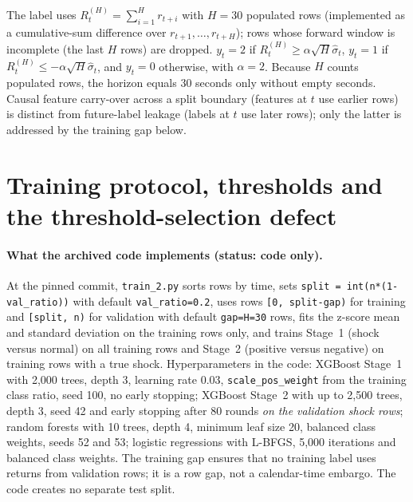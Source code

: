 \documentclass[10pt,a4paper]{article}
\begin{document}
The label uses $R^{(H)}_t=\sum_{i=1}^{H}r_{t+i}$ with $H=30$ populated rows (implemented as a cumulative-sum difference over $r_{t+1},\dots,r_{t+H}$); rows whose forward window is incomplete (the last $H$ rows) are dropped. $y_t=2$ if $R^{(H)}_t\ge\alpha\sqrt{H}\hat\sigma_t$, $y_t=1$ if $R^{(H)}_t\le-\alpha\sqrt{H}\hat\sigma_t$, and $y_t=0$ otherwise, with $\alpha=2$. Because $H$ counts populated rows, the horizon equals 30 seconds only without empty seconds. Causal feature carry-over across a split boundary (features at $t$ use earlier rows) is distinct from future-label leakage (labels at $t$ use later rows); only the latter is addressed by the training gap below.

\section{Training protocol, thresholds and the threshold-selection defect}
\label{sec:training}
\paragraph{What the archived code implements (status: code only).} At the pinned commit, \texttt{train\_2.py} sorts rows by time, sets \texttt{split = int(n*(1-val\_ratio))} with default \texttt{val\_ratio=0.2}, uses rows \texttt{[0, split-gap)} for training and \texttt{[split, n)} for validation with default \texttt{gap=H=30} rows, fits the z-score mean and standard deviation on the training rows only, and trains Stage~1 (shock versus normal) on all training rows and Stage~2 (positive versus negative) on training rows with a true shock. Hyperparameters in the code: XGBoost Stage~1 with 2,000 trees, depth 3, learning rate 0.03, \texttt{scale\_pos\_weight} from the training class ratio, seed 100, no early stopping; XGBoost Stage~2 with up to 2,500 trees, depth 3, seed 42 and early stopping after 80 rounds \emph{on the validation shock rows}; random forests with 10 trees, depth 4, minimum leaf size 20, balanced class weights, seeds 52 and 53; logistic regressions with L-BFGS, 5,000 iterations and balanced class weights. The training gap ensures that no training label uses returns from validation rows; it is a row gap, not a calendar-time embargo. The code creates no separate test split.
\end{document}
